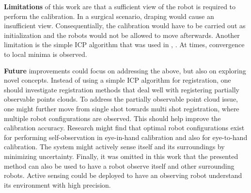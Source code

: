 \textbf{Limitations} of this work are that a sufficient view of the robot is required to perform the calibration. In a surgical scenario, draping would cause an insufficient view. Consequentially, the calibration would have to be carried out as initialization and the robots would not be allowed to move afterwards. Another limitation is the simple ICP algorithm that was used in , . At times, convergence to local minima is observed.

\textbf{Future} improvements could focus on addressing the above, but also on exploring novel concepts. Instead of using a simple ICP algorithm for registration, one should investigate registration methods that deal well with registering partially observable points clouds. To address the partially observable point cloud issue, one might further move from single shot towards multi shot registration, where multiple robot configurations are observed. This should help improve the calibration accuracy. Research might find that optimal robot configurations exist for performing self-observation in eye-in-hand calibration and also for eye-to-hand calibration. The system might actively sense itself and its surroundings by minimizing uncertainty. Finally, it was omitted in this work that the presented method can also be used to have a robot observe itself and other surrounding robots. Active sensing could be deployed to have an observing robot understand its environment with high precision.
